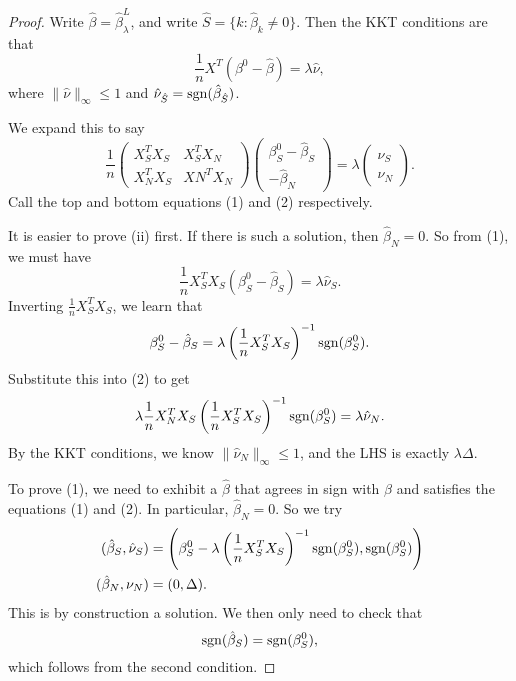 \documentclass[a4paper]{article}
\begin{document}
\begin{proof}
  Write $\hat{\beta} = \hat{\beta}^L_\lambda$, and write $\hat{S} = \{k: \hat{\beta}_k \not= 0\}$. Then the KKT conditions are that
  \[
    \frac{1}{n} X^T (\beta^0 - \hat{\beta}) = \lambda \hat{\nu},
  \]
  where $\|\hat{\nu}\|_{\infty} \leq 1$ and $\hat{\nu}_{\hat{S}} = \operatorname{sgn} (\hat{\beta}_{\hat{S}})$.

  We expand this to say
  \[
    \frac{1}{n}
    \begin{pmatrix}
      X_S^T X_S & X_S^T X_N\\
      X_N^T X_S & XN^T X_N
    \end{pmatrix}
    \begin{pmatrix}
      \beta^0_S - \hat{\beta}_S\\
      -\hat{\beta}_N
    \end{pmatrix} = \lambda
    \begin{pmatrix}
      \hat{\nu}_S\\
      \hat{\nu}_N
    \end{pmatrix}.
  \]
  Call the top and bottom equations (1) and (2) respectively.

  It is easier to prove (ii) first. If there is such a solution, then $\hat{\beta}_N = 0$. So from (1), we must have
  \[
    \frac{1}{n} X_S^T X_S (\beta^0_S - \hat{\beta}_S) = \lambda \hat{\nu}_S.
  \]
  Inverting $\frac{1}{n} X_S^T X_S$, we learn that
  \[
    \beta^0_S - \hat{\beta}_S = \lambda \left(\frac{1}{n} X_S^T X_S\right)^{-1} \operatorname{sgn} (\beta^0_S).
  \]
  Substitute this into (2) to get
  \[
    \lambda \frac{1}{n} X_N^T X_S \left(\frac{1}{n} X_S^T X_S\right)^{-1} \operatorname{sgn} (\beta^0_S) = \lambda \hat{\nu}_N.
  \]
  By the KKT conditions, we know $\|\hat{\nu}_N\|_\infty \leq 1$, and the LHS is exactly $\lambda\Delta$.

  To prove (1), we need to exhibit a $\hat{\beta}$ that agrees in sign with $\hat{\beta}$ and satisfies the equations (1) and (2). In particular, $\hat{\beta}_N = 0$. So we try
  \begin{align*}
    (\hat{\beta}_S, \hat{\nu}_S) &= \left(\beta^0_S - \lambda \left(\frac{1}{n} X_S^T X_S\right)^{-1} \operatorname{sgn} (\beta^0_S), \operatorname{sgn} (\beta^0_S)\right)\\
    (\hat{\beta}_N, \nu_N) &= (0, \Delta).
  \end{align*}
  This is by construction a solution. We then only need to check that
  \[
    \operatorname{sgn} (\hat{\beta}_S) = \operatorname{sgn} (\beta^0_S),
  \]
  which follows from the second condition.
\end{proof}
\end{document}
